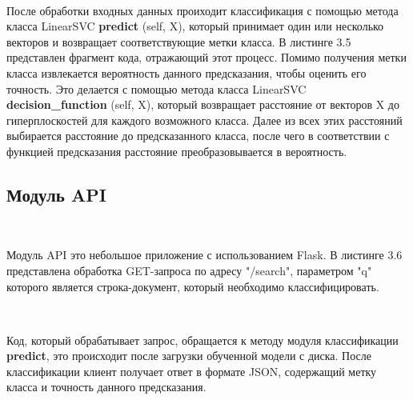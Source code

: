 
\

После обработки входных данных проиходит классификация с помощью метода класса LinearSVC \textbf{predict} (self, X), который принимает один или несколько векторов и возвращает соответствующие метки класса. В листинге 3.5 представлен фрагмент кода, отражающий этот процесс. Помимо получения метки класса извлекается вероятность данного предсказания, чтобы оценить его точность. Это делается с помощью метода класса LinearSVC \textbf{decision\_function} (self, X), который возвращает расстояние от векторов X до гиперплоскостей для каждого возможного класса. Далее из всех этих расстояний выбирается расстояние до предсказанного класса, после чего в соответствии с функцией предсказания расстояние преобразовывается в вероятность.

\newpage


\subsection{Модуль API}
\

Модуль API это небольшое приложение с использованием Flask. В листинге 3.6 представлена обработка GET-запроса по адресу "/search", параметром "q" которого является строка-документ, который необходимо классифицировать. 


\

Код, который обрабатывает запрос, обращается к методу модуля классификации \textbf{predict}, это происходит после загрузки обученной модели с диска. После классификации клиент получает ответ в формате JSON, содержащий метку класса и точность данного предсказания.

\newpage
